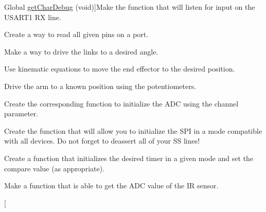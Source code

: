 \begin{DoxyRefList}
\hypertarget{todo__todo000030}{}%
Global \hyperlink{_u_s_a_r_t_debug_8h_aeaa27830bd87dcec2dd03213b02f22aa}{get\-Char\-Debug} (void)]Make the function that will listen for input on the U\-S\-A\-R\-T1 R\-X line.  
\item[\label{todo__todo000020}%
\hypertarget{todo__todo000020}{}%
Global \hyperlink{ports_8h_a85e9d6d0f75513f3f961c41861299430}{get\-Pins\-Val} (char port, int num\-Pins,...)]Create a way to read all given pins on a port.  
\item[\label{todo__todo000007}%
\hypertarget{todo__todo000007}{}%
Global \hyperlink{motors_8h_af29dc743a43c233ac843475727db132f}{goto\-Angles} (int lower\-Theta, int upper\-Theta)]Make a way to drive the links to a desired angle.  
\item[\label{todo__todo000008}%
\hypertarget{todo__todo000008}{}%
Global \hyperlink{motors_8h_aa294b49bfcc17cf4b490fb020e359851}{goto\-X\-Y} (int x, int y)]Use kinematic equations to move the end effector to the desired position.  
\item[\label{todo__todo000010}%
\hypertarget{todo__todo000010}{}%
Global \hyperlink{motors_8h_a946fb06843f118c8abacd3aef032584c}{home\-Pos} ()]Drive the arm to a known position using the potentiometers.  
\item[\label{todo__todo000001}%
\hypertarget{todo__todo000001}{}%
Global \hyperlink{_a_d_c_8h_a1f27a9e1c089f93efc89cdce78739cba}{init\-A\-D\-C} (int channel)]Create the corresponding function to initialize the A\-D\-C using the channel parameter.  
\item[\label{todo__todo000024}%
\hypertarget{todo__todo000024}{}%
Global \hyperlink{_s_p_i_8h_a070402cc6c1cae693d10f59f9c483f76}{init\-S\-P\-I} ()]Create the function that will allow you to initialize the S\-P\-I in a mode compatible with all devices. Do not forget to deassert all of your S\-S lines!  
\item[\label{todo__todo000026}%
\hypertarget{todo__todo000026}{}%
Global \hyperlink{timer_8h_a467daa2177a6f16447a9ada6303c849a}{init\-Timer} (int timer, int mode, unsigned int comp)]Create a function that initializes the desired timer in a given mode and set the compare value (as appropriate).  
\item[\label{todo__todo000012}%
\hypertarget{todo__todo000012}{}%
Global \hyperlink{_periph_8h_ae0fb6b592e76f0934db14682e63982df}{I\-R\-Dist} (int chan)]Make a function that is able to get the A\-D\-C value of the I\-R sensor.  
\item[\label{todo__todo000016}%
\hypertarget{todo__todo000016}{}%

\end{DoxyRefList}
